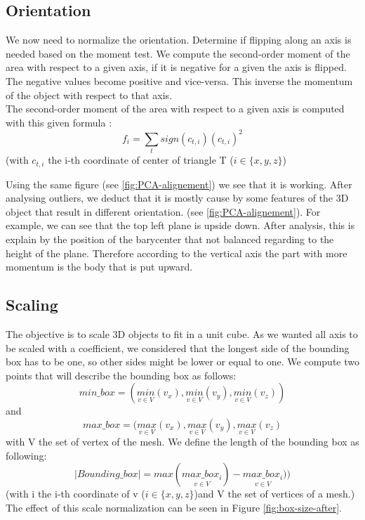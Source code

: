 \documentclass[10pt,twocolumn,letterpaper]{article}
\begin{document}
\subsection{Orientation}
	We now need to normalize the orientation. Determine if flipping along an axis is needed based on the moment test. We compute the second-order moment of the area with respect to a given axis, if it is negative for a given the axis is flipped. The negative values become positive and vice-versa. This inverse the momentum of the object with respect to that axis.\\
The second-order moment of the area with respect to a given axis is computed with this given formula :
	$$ f_i = \sum_{t} sign(c_{t,i})(c_{t,i})^2  $$ (with $c_{t,i}$ the i-th coordinate of center of triangle T ($i \in \{x,y,z\}$)
	
	Using the same figure (see \ref{fig:PCA-alignement}) we see that it is working. After analysing outliers, we deduct that it is mostly cause by some features of the 3D object that result in different orientation. (see \ref{fig:PCA-alignement}). For example, we can see that the top left plane is upside down. After analysis, this is explain by the position of the barycenter that not balanced regarding to the height of the plane. Therefore according to the vertical axis the part with more momentum is the body that is put upward.
	
\subsection{Scaling}
	The objective is to scale 3D objects to fit in a unit cube. As we wanted all axis to be scaled with a coefficient, we considered that the longest side of the bounding box has to be one, so other sides might be lower or equal to one.
We compute two points that will describe the bounding box as follows:
$$min\_box = (\underset{v \in V}{min}(v_x),\underset{v \in V}{min}(v_y),\underset{v \in V}{min}(v_z)) $$ and $$max\_box = (\underset{v \in V}{max}(v_x), \underset{v \in V}{max}(v_y), \underset{v \in V}{max}(v_z)$$ with V the set of vertex of the mesh.
We define the length of the bounding box as following:
$$ |Bounding\_box| = max(\underset{v \in V}{max\_box_i}) - \underset{v \in V}{max\_box_i}))$$ (with i the i-th coordinate of v ($i \in \{x,y,z\}$)and V the set of vertices of a mesh.)
The effect of this scale normalization can be seen in Figure \ref{fig:box-size-after}.
\end{document}
